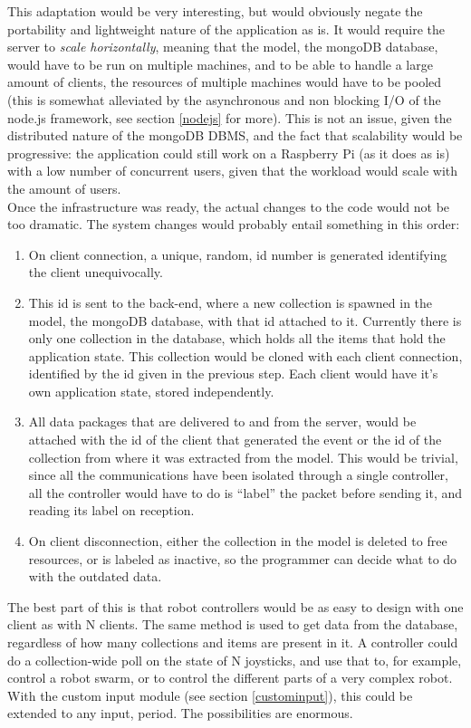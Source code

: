 This adaptation would be very interesting, but would obviously negate the portability and lightweight nature of the application as 
is. It would require the server to \textit{scale horizontally}, meaning that the model, the mongoDB database, would have to be run 
on multiple machines, and to be able to handle a large amount of clients, the resources of multiple machines would have to be 
pooled (this is somewhat alleviated by the asynchronous and non blocking I/O of the node.js framework, see section \ref{nodejs} for 
more). This is not an issue, given the distributed nature of the mongoDB DBMS, and the fact that scalability would be progressive: 
the application could still work on a Raspberry Pi (as it does as is) with a low number of concurrent users, given that the 
workload would scale with the amount of users.\\

Once the infrastructure was ready, the actual changes to the code would not be too dramatic. The system changes would probably 
entail something in this order:
\begin{enumerate}
	\item On client connection, a unique, random, id number is generated identifying the client unequivocally.
	\item This id is sent to the back-end, where a new collection is spawned in the model, the mongoDB database, with that id 
	attached to it. Currently there is only one collection in the database, which holds all the items that hold the application 
	state. This collection would be cloned with each client connection, identified by the id given in the previous step. Each 
	client would have it's own application state, stored independently.
	\item All data packages that are delivered to and from the server, would be attached with the id of the client that generated 
	the event or the id of the collection from where it was extracted from the model. This would be trivial, since all the 
	communications have been isolated through a single controller, all the controller would have to do is ``label'' the packet 
	before sending it, and reading its label on reception.
	\item On client disconnection, either the collection in the model is deleted to free resources, or is labeled as inactive, so 
	the programmer can decide what to do with the outdated data.
\end{enumerate}
The best part of this is that robot controllers would be as easy to design with one client as with N clients. The same method is 
used to get data from the database, regardless of how many collections and items are present in it. A controller could do a 
collection-wide poll on the state of N joysticks, and use that to, for example, control a robot swarm, or to control the different 
parts of a very complex robot. With the custom input module (see section \ref{custominput}), this could be extended to any input, 
period. The possibilities are enormous.\\

